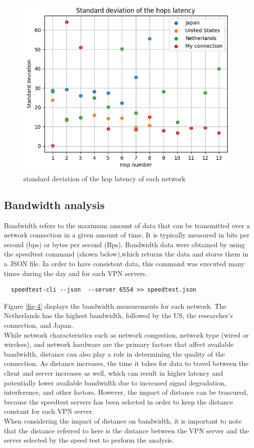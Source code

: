 \documentclass[eng]{class}
\begin{document}
\begin{figure}[H]
  \centering
  \includegraphics[width=.7\columnwidth]{images/varLHops.png}
  \caption{standard deviation of the hop latency of each network}
  \label{fig-3}
\end{figure}

\subsection{Bandwidth analysis}
Bandwidth refers to the maximum amount of data that can be transmitted over a network connection in a given amount of time.
It is typically measured in bits per second (bps) or bytes per second (Bps).
Bandwidth data were obtained by using the speedtest command (shown below),which returns the data and stores them in a JSON file.
In order to have consistent data, this command was executed many times during the day and for each VPN servers.
\begin{lstlisting}
  speedtest-cli --json  --server 6554 >> speedtest.json
\end{lstlisting}
Figure \ref*{fig-4} displays the bandwidth measurements for each network.
The Netherlands has the highest bandwidth, followed by the US, the researcher's connection, and Japan.\\
While network characteristics such as network congestion, network type (wired or wireless),
and network hardware are the primary factors that affect available bandwidth, distance can also play a role in determining the quality of the connection.
As distance increases, the time it takes for data to travel between the client and server increases as well,
which can result in higher latency and potentially lower available bandwidth due to increased signal degradation, interference, and other factors.
However, the impact of distance can be trascured, because the speedtest servers has been selected in order to keep the distance constant for each VPN server.\\
When considering the impact of distance on bandwidth, it is important to note that the distance referred to here is the distance between the VPN server and
the server selected by the speed test to perform the analysis.
\end{document}
